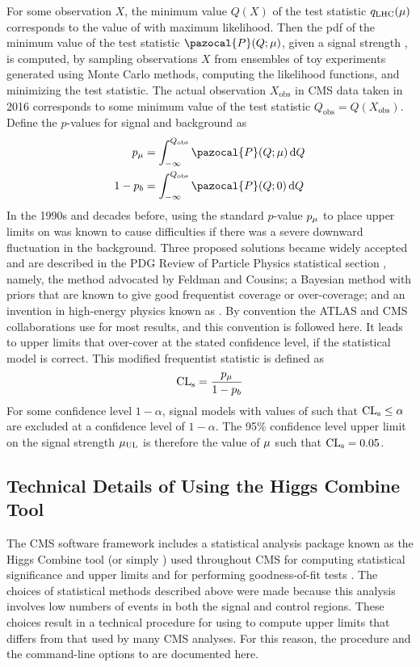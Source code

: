 For some observation $X$, the minimum value $Q(X)$ of the test statistic $q_\text{LHC}(\mu)$ corresponds to the value of \sigstr with maximum likelihood.
Then the pdf of the minimum value of the test statistic $\pazocal{P}(Q;\sigstr)$, given a signal strength \sigstr, is computed, by sampling observations $X$ from ensembles of toy experiments generated using Monte Carlo methods, computing the likelihood functions, and minimizing the test statistic.
The actual observation $X_\text{obs}$ in CMS data taken in 2016 corresponds to some minimum value of the test statistic $Q_\text{obs} = Q(X_\text{obs})$.
Define the $p$-values for signal and background as
\begin{align}
  p_\sigstr   &= \int_{-\infty}^{Q_\text{obs}}{\pazocal{P}(Q;\sigstr)\dd{Q}}\\
  1 - p_b     &= \int_{-\infty}^{Q_\text{obs}}{\pazocal{P}(Q;0)      \dd{Q}}
  \label{eq:dd:pvalues}
\end{align}
In the 1990s and decades before, using the standard $p$-value $p_\mu$ to place upper limits on \sigstr was known to cause difficulties if there was a severe downward fluctuation in the background.
Three proposed solutions became widely accepted and are described in the PDG Review of Particle Physics statistical section \cite{CowanPDGStats}, namely, the method advocated by Feldman and Cousins; a Bayesian method with priors that are known to give good frequentist coverage or over-coverage; and an invention in high-energy physics known as \CLs.
By convention the ATLAS and CMS collaborations use \CLs \cite{Read:CLs, Junk:CLs} for most results, and this convention is followed here.
It leads to upper limits that over-cover at the stated confidence level, if the statistical model is correct.
This modified frequentist statistic \CLs is defined as
\begin{equation}
  \text{CL}_\text{s} = \frac{p_\mu}{1-p_b}
  \label{eq:CLs}
\end{equation}
For some confidence level $1-\alpha$, signal models with values of \CLs such that $\text{CL}_\text{s} \leq \alpha$ are excluded at a confidence level of $1-\alpha$.
The 95\% confidence level upper limit on the signal strength $\mu_\text{UL}$ is therefore the value of $\mu$ such that $\text{CL}_\text{s} = 0.05$.

\subsection{Technical Details of Using the Higgs Combine Tool}
\label{sec:dd:combine}
The CMS software framework includes a statistical analysis package known as the Higgs Combine tool (or simply \combine) used throughout CMS for computing statistical significance and upper limits and for performing goodness-of-fit tests \cite{CombineManual}.
The choices of statistical methods described above were made because this analysis involves low numbers of events in both the signal and control regions.
These choices result in a technical procedure for using \combine to compute upper limits that differs from that used by many CMS analyses.
For this reason, the procedure and the command-line options to \combine are documented here.

